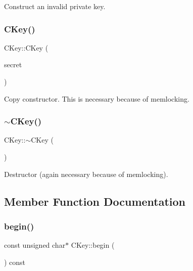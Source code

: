 Construct an invalid private key. 

\mbox{\label{class_c_key_afcea34cefd25675f4cf9b03eaa4bb7d9}} 
\subsubsection{\texorpdfstring{C\+Key()}{CKey()}\hspace{0.1cm}{\footnotesize\ttfamily [2/2]}}
{\footnotesize\ttfamily C\+Key\+::\+C\+Key (\begin{DoxyParamCaption}\item[{const \mbox{\hyperlink{class_c_key}{C\+Key}} \&}]{secret }\end{DoxyParamCaption})\hspace{0.3cm}{\ttfamily [inline]}}



Copy constructor. This is necessary because of memlocking. 

\mbox{\label{class_c_key_a57d5b254748cef054c40f99c1c339147}} 
\subsubsection{\texorpdfstring{$\sim$\+C\+Key()}{~CKey()}}
{\footnotesize\ttfamily C\+Key\+::$\sim$\+C\+Key (\begin{DoxyParamCaption}{ }\end{DoxyParamCaption})\hspace{0.3cm}{\ttfamily [inline]}}



Destructor (again necessary because of memlocking). 



\subsection{Member Function Documentation}
\mbox{\label{class_c_key_ab8dee0ad9d933304a22284ee40040847}} 
\subsubsection{\texorpdfstring{begin()}{begin()}}
{\footnotesize\ttfamily const unsigned char$\ast$ C\+Key\+::begin (\begin{DoxyParamCaption}{ }\end{DoxyParamCaption}) const\hspace{0.3cm}{\ttfamily [inline]}}

